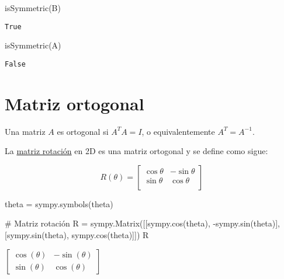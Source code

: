 \documentclass[
  letterpaper,
  DIV=11,
  numbers=noendperiod]{scrreprt}
\newenvironment{Shaded}{\begin{snugshade}}{\end{snugshade}}
\newcommand{\CommentTok}[1]{\textcolor[rgb]{0.37,0.37,0.37}{#1}}
\newcommand{\NormalTok}[1]{\textcolor[rgb]{0.00,0.23,0.31}{#1}}
\newcommand{\OperatorTok}[1]{\textcolor[rgb]{0.37,0.37,0.37}{#1}}
\newcommand{\StringTok}[1]{\textcolor[rgb]{0.13,0.47,0.30}{#1}}
\begin{document}
\begin{Shaded}
\begin{Highlighting}[]
\NormalTok{isSymmetric(B)}
\end{Highlighting}
\end{Shaded}

\begin{verbatim}
True
\end{verbatim}

\begin{Shaded}
\begin{Highlighting}[]
\NormalTok{isSymmetric(A)}
\end{Highlighting}
\end{Shaded}

\begin{verbatim}
False
\end{verbatim}

\section{Matriz ortogonal}\label{matriz-ortogonal}

Una matriz \(A\) es ortogonal si \(A^T A = I\), o equivalentemente
\(A^T = A^{-1}\).

La \href{https://es.wikipedia.org/wiki/Matriz_de_rotaci\%C3\%B3n}{matriz
rotación} en 2D es una matriz ortogonal y se define como sigue:

\[
R(\theta )=
\begin{bmatrix}
\cos \theta &-\sin \theta \\
\sin \theta & \cos \theta \\
\end{bmatrix}
\]

\begin{Shaded}
\begin{Highlighting}[]
\NormalTok{theta }\OperatorTok{=}\NormalTok{ sympy.symbols(}\StringTok{\textquotesingle{}theta\textquotesingle{}}\NormalTok{)}

\CommentTok{\# Matriz rotación}
\NormalTok{R }\OperatorTok{=}\NormalTok{ sympy.Matrix([[sympy.cos(theta), }\OperatorTok{{-}}\NormalTok{sympy.sin(theta)],}
\NormalTok{                  [sympy.sin(theta), sympy.cos(theta)]])}
\NormalTok{R}
\end{Highlighting}
\end{Shaded}

$\displaystyle \left[\begin{matrix}\cos{\left(\theta \right)} & - \sin{\left(\theta \right)}\\\sin{\left(\theta \right)} & \cos{\left(\theta \right)}\end{matrix}\right]$
\end{document}
